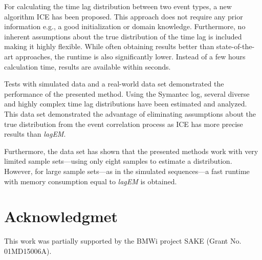 \documentclass[conference]{IEEEtran}
\theoremstyle{examplestyle}
\begin{document}
For calculating the time lag distribution between two event types, a new algorithm \ac{ICE} has been proposed. This approach does not require any prior information e.g., a good initialization or domain knowledge. Furthermore, no inherent assumptions about the true distribution of the time lag is included making it highly flexible. While often obtaining results better than state-of-the-art approaches, the runtime is also significantly lower. Instead of a few hours calculation time, results are available within seconds.

Tests with simulated data and a real-world data set demonstrated the performance of the presented method. Using the Symantec log, several diverse and highly complex time lag distributions have been estimated and analyzed. This data set demonstrated the advantage of eliminating assumptions about the true distribution from the event correlation process as \ac{ICE} has more precise results than \textit{lagEM}.

Furthermore, the data set has shown that the presented methods work with very limited sample sets---using only eight samples to estimate a distribution. However, for large sample sets---as in the simulated sequences---a fast runtime with memory consumption equal to \textit{lagEM} is obtained.



\section{Acknowledgmet}
This work was partially supported by the BMWi project SAKE (Grant No. 01MD15006A). 






\end{document}
